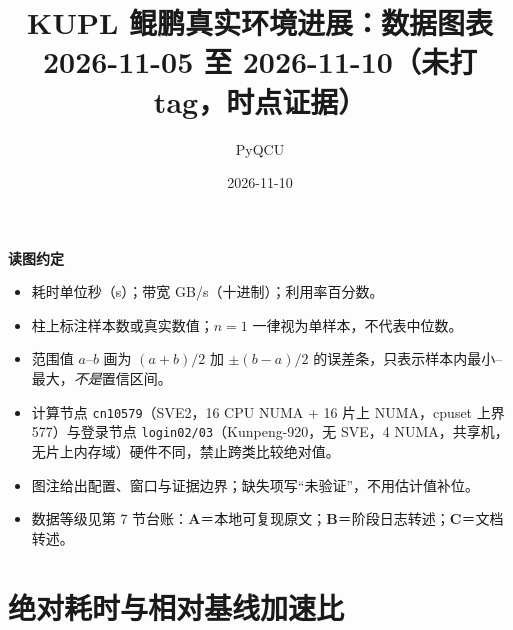 \documentclass[10pt]{article}
\title{KUPL 鲲鹏真实环境进展：数据图表\\\large 2026-11-05 至 2026-11-10（未打 tag，时点证据）}
\author{PyQCU}
\date{2026-11-10}
\begin{document}
\maketitle

\noindent\textbf{读图约定}
\begin{itemize}\itemsep1pt
  \item 耗时单位秒（s）；带宽 GB/s（十进制）；利用率百分数。
  \item 柱上标注样本数或真实数值；$n{=}1$ 一律视为单样本，不代表中位数。
  \item 范围值 $a$--$b$ 画为 $(a+b)/2$ 加 $\pm(b-a)/2$ 的误差条，只表示样本内最小--最大，\emph{不是}置信区间。
  \item 计算节点 \texttt{cn10579}（SVE2，16 CPU NUMA + 16 片上 NUMA，cpuset 上界 577）与登录节点 \texttt{login02/03}（Kunpeng-920，无 SVE，4 NUMA，共享机，无片上内存域）硬件不同，禁止跨类比较绝对值。
  \item 图注给出配置、窗口与证据边界；缺失项写“未验证”，不用估计值补位。
  \item 数据等级见第 7 节台账：\textbf{A}＝本地可复现原文；\textbf{B}＝阶段日志转述；\textbf{C}＝文档转述。
\end{itemize}

\tableofcontents
\vspace{4mm}

\section{绝对耗时与相对基线加速比}
\end{document}
